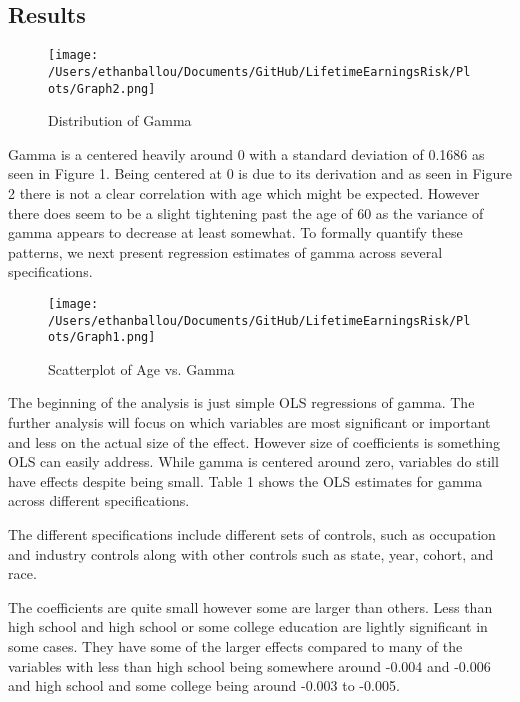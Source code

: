 \documentclass[12pt]{article}
\begin{document}
\begin{onehalfspace}
\section{Results}



\begin{figure}[H]
    \centering
    \texttt{[image: /Users/ethanballou/Documents/GitHub/LifetimeEarningsRisk/Plots/Graph2.png]}
    \caption{Distribution of Gamma}
\end{figure}






Gamma is a centered heavily around 0 with a standard deviation of 0.1686 as seen in Figure 1. Being centered at 0 is due to its derivation and as seen in Figure 2 there is not a clear correlation with age which might be expected. However there does seem to be a slight tightening past the age of 60 as the variance of gamma appears to decrease at least somewhat. To formally quantify these patterns, we next present regression estimates of gamma across several specifications.


\begin{figure}[H]
    \centering
    \texttt{[image: /Users/ethanballou/Documents/GitHub/LifetimeEarningsRisk/Plots/Graph1.png]}
    \caption{Scatterplot of Age vs. Gamma}
\end{figure}




The beginning of the analysis is just simple OLS regressions of gamma. The further analysis will focus on which variables are most significant or important and less on the actual size of the effect. However size of coefficients is something OLS can easily address. While gamma is centered around zero, variables do still have effects despite being small. Table 1 shows the OLS estimates for gamma across different specifications. 

The different specifications include different sets of controls, such as occupation and industry controls along with other controls such as state, year, cohort, and race.



The coefficients are quite small however some are larger than others. Less than high school and high school or some college education are lightly significant in some cases. They have some of the larger effects compared to many of the variables with less than high school being somewhere around -0.004 and -0.006 and high school and some college being around -0.003 to -0.005. 


\end{onehalfspace}
\end{document}
